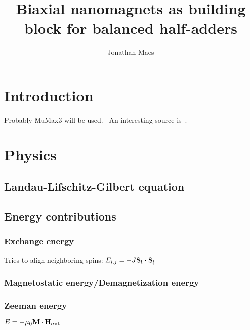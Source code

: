 \documentclass[10pt,a4paper]{article}
\author{Jonathan Maes}
\title{Biaxial nanomagnets as building block for balanced half-adders}
\begin{document}
	\begin{titlingpage}
	\maketitle
	\end{titlingpage}

	\newpage
	
	\tableofcontents
	\newpage

	\section{Introduction}
	Probably MuMax3 will be used.~\cite{MuMax3}
	An interesting source is~\cite{NML_Carlton}.
	
	\section{Physics}
	\subsection{Landau-Lifschitz-Gilbert equation}
	\subsection{Energy contributions}
	\subsubsection{Exchange energy}
	Tries to align neighboring spins:
	$E_{i,j} = -J \vb{S_i} \vdot \vb{S_j}$
	\subsubsection{Magnetostatic energy/Demagnetization energy}
	
	\subsubsection{Zeeman energy}
	$E = -\mu_0 \vb{M} \cdot \vb{H_{ext}}$
	
	
	\newpage
	
	
\end{document}
